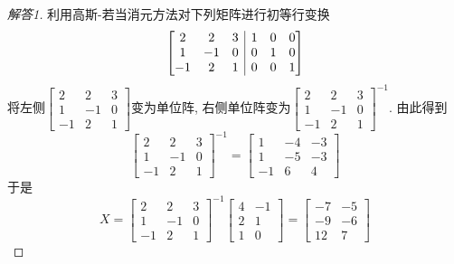 \documentclass[UTF8]{ctexart}
\newenvironment{bmatriX}[1]{\left[\hskip -\arraycolsep \begin{array}{#1}}{\end{array}\hskip -\arraycolsep\right]}
\begin{document}
\begin{proof}[解答1]
利用高斯-若当消元方法对下列矩阵进行初等行变换
\[
\begin{bmatriX}{ccc|ccc} 2 & 2 & 3 & 1 & 0 & 0 \\ 1 & -1 & 0 & 0 & 1 & 0 \\ -1 & 2 & 1& 0 & 0 &1 \end{bmatriX}
\]
将左侧$\begin{bmatrix} 2 & 2 & 3\\ 1 & -1 & 0 \\ -1 & 2 & 1  \end{bmatrix}$变为单位阵, 右侧单位阵变为$\begin{bmatrix} 2 & 2 & 3\\ 1 & -1 & 0 \\ -1 & 2 & 1  \end{bmatrix}^{-1}.$ 由此得到
\[
\begin{bmatrix} 2 & 2 & 3\\ 1 & -1 & 0 \\ -1 & 2 & 1  \end{bmatrix}^{-1} = \begin{bmatrix} 1 & -4 & -3\\ 1 & -5 & -3 \\ -1 & 6 & 4  \end{bmatrix}
\]
于是
\[
X = \begin{bmatrix} 2 & 2 & 3\\ 1 & -1 & 0 \\ -1 & 2 & 1  \end{bmatrix}^{-1}\begin{bmatrix} 4 & -1 \\ 2 & 1  \\ 1 & 0  \end{bmatrix} = \begin{bmatrix} -7 & -5 \\ -9 & -6  \\ 12 & 7  \end{bmatrix}
\]
\end{proof}
\end{document}
